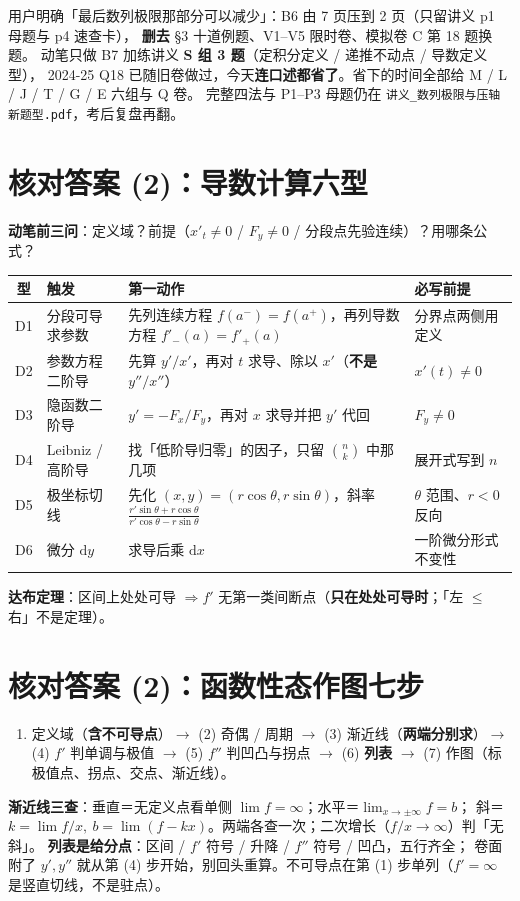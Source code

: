 \documentclass[10pt,a4paper]{ctexart}
\newcommand{\D}{\mathrm{d}}
\begin{document}
\begin{keypoint}[15:23 改订：这一段今天不展开]
用户明确「最后数列极限那部分可以减少」：B6 由 7 页压到 2 页（只留讲义 p1 母题与 p4 速查卡），
\textbf{删去} §3 十道例题、V1--V5 限时卷、模拟卷 C 第 18 题换题。
动笔只做 B7 加练讲义 \textbf{S 组 3 题}（定积分定义 / 递推不动点 / 导数定义型），
2024-25 Q18 已随旧卷做过，今天\textbf{连口述都省了}。省下的时间全部给 M / L / J / T / G / E 六组与 Q 卷。
完整四法与 P1--P3 母题仍在 \texttt{讲义\_数列极限与压轴新题型.pdf}，考后复盘再翻。
\end{keypoint}

\clearpage

\section*{核对答案 (2)：导数计算六型}
\textbf{动笔前三问}：定义域？前提（$x'_t\ne0$ / $F_y\ne0$ / 分段点先验连续）？用哪条公式？
\small\setlength{\tabcolsep}{4pt}
\begin{tabularx}{\linewidth}{c|p{3.4cm}|p{5.2cm}|X}
\toprule
型 & 触发 & 第一动作 & 必写前提 \\
\midrule
D1 & 分段可导求参数 & 先列连续方程 $f(a^-)=f(a^+)$，再列导数方程 $f'_-(a)=f'_+(a)$ & 分界点两侧用定义 \\
D2 & 参数方程二阶导 & 先算 $y'/x'$，再对 $t$ 求导、除以 $x'$（\textbf{不是} $y''/x''$） & $x'(t)\ne0$ \\
D3 & 隐函数二阶导 & $y'=-F_x/F_y$，再对 $x$ 求导并把 $y'$ 代回 & $F_y\ne0$ \\
D4 & Leibniz / 高阶导 & 找「低阶导归零」的因子，只留 $\binom nk$ 中那几项 & 展开式写到 $n$ \\
D5 & 极坐标切线 & 先化 $(x,y)=(r\cos\theta,r\sin\theta)$，斜率 $\frac{r'\sin\theta+r\cos\theta}{r'\cos\theta-r\sin\theta}$ & $\theta$ 范围、$r<0$ 反向 \\
D6 & 微分 $\D y$ & 求导后乘 $\D x$ & 一阶微分形式不变性 \\
\bottomrule
\end{tabularx}
\normalsize\smallskip
\textbf{达布定理}：区间上处处可导 $\Rightarrow f'$ 无第一类间断点（\textbf{只在处处可导时}；「左 $\le$ 右」不是定理）。

\section*{核对答案 (2)：函数性态作图七步}
\begin{enumerate}
\item 定义域（\textbf{含不可导点}）$\to$ (2) 奇偶 / 周期 $\to$ (3) 渐近线（\textbf{两端分别求}）$\to$
      (4) $f'$ 判单调与极值 $\to$ (5) $f''$ 判凹凸与拐点 $\to$ (6) \textbf{列表} $\to$
      (7) 作图（标极值点、拐点、交点、渐近线）。
\end{enumerate}
\textbf{渐近线三查}：垂直＝无定义点看单侧 $\lim f=\infty$；水平＝$\lim_{x\to\pm\infty}f=b$；
斜＝$k=\lim f/x,\ b=\lim(f-kx)$。两端各查一次；二次增长（$f/x\to\infty$）判「无斜」。
\textbf{列表是给分点}：区间 / $f'$ 符号 / 升降 / $f''$ 符号 / 凹凸，五行齐全；
卷面附了 $y',y''$ 就从第 (4) 步开始，别回头重算。不可导点在第 (1) 步单列（$f'=\infty$ 是竖直切线，不是驻点）。
\end{document}
